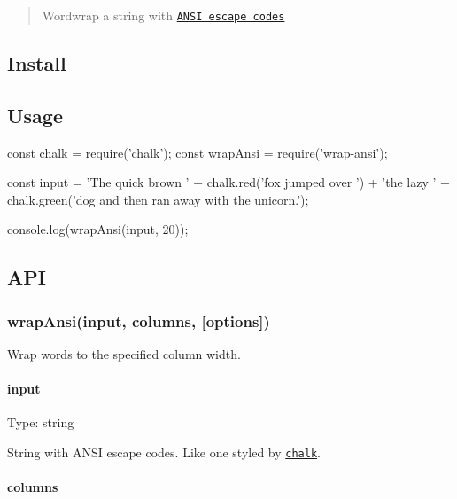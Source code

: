 \begin{quote}
Wordwrap a string with \href{http://en.wikipedia.org/wiki/ANSI_escape_code#Colors_and_Styles}{\tt A\+N\+SI escape codes} \end{quote}


\subsection*{Install}




\subsection*{Usage}


\begin{DoxyCode}
const chalk = require('chalk');
const wrapAnsi = require('wrap-ansi');

const input = 'The quick brown ' + chalk.red('fox jumped over ') +
    'the lazy ' + chalk.green('dog and then ran away with the unicorn.');

console.log(wrapAnsi(input, 20));
\end{DoxyCode}




\subsection*{A\+PI}

\subsubsection*{wrap\+Ansi(input, columns, \mbox{[}options\mbox{]})}

Wrap words to the specified column width.

\paragraph*{input}

Type\+: {\ttfamily string}

String with A\+N\+SI escape codes. Like one styled by \href{https://github.com/chalk/chalk}{\tt {\ttfamily chalk}}.

\paragraph*{columns}

